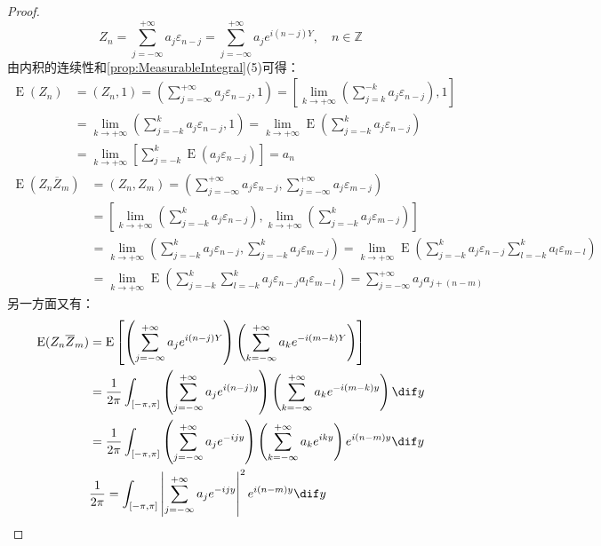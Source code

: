 \begin{proof}
	\begin{equation*}
		Z_n=\sum_{j=-\infty}^{+\infty}a_j\varepsilon_{n-j}=\sum_{j=-\infty}^{+\infty}a_je^{i(n-j)Y},\quad n\in\mathbb{Z}^{}
	\end{equation*}
	由内积的连续性和\cref{prop:MeasurableIntegral}(5)可得：
	\begin{align*}
		\operatorname{E}(Z_n)&=(Z_n,1)=\left(\sum_{j=-\infty}^{+\infty}a_j\varepsilon_{n-j},1\right)=\left[\lim_{k\to+\infty}\left(\sum_{j=k}^{-k}a_j\varepsilon_{n-j}\right),1\right] \\
		&=\lim_{k\to+\infty}\left(\sum_{j=-k}^{k}a_j\varepsilon_{n-j},1\right)=\lim_{k\to+\infty}\operatorname{E}\left(\sum_{j=-k}^{k}a_j\varepsilon_{n-j}\right) \\
		&=\lim_{k\to+\infty}\left[\sum_{j=-k}^{k}\operatorname{E}(a_j\varepsilon_{n-j})\right]=a_n
	\end{align*}
	\begin{align*}
		\operatorname{E}(Z_n\overline{Z}_m)&=(Z_n,Z_m)=\left(\sum_{j=-\infty}^{+\infty}a_j\varepsilon_{n-j},\sum_{j=-\infty}^{+\infty}a_j\varepsilon_{m-j}\right) \\
		&=\left[\lim_{k\to+\infty}\left(\sum_{j=-k}^{k}a_j\varepsilon_{n-j}\right),\lim_{k\to+\infty}\left(\sum_{j=-k}^{k}a_j\varepsilon_{m-j}\right)\right] \\
		&=\lim_{k\to+\infty}\left(\sum_{j=-k}^{k}a_j\varepsilon_{n-j},\sum_{j=-k}^{k}a_j\varepsilon_{m-j}\right)=\lim_{k\to+\infty}\operatorname{E}\left(\sum_{j=-k}^{k}a_j\varepsilon_{n-j}\sum_{l=-k}^{k}a_l\varepsilon_{m-l}\right) \\
		&=\lim_{k\to+\infty}\operatorname{E}\left(\sum_{j=-k}^{k}\sum_{l=-k}^{k}a_j\varepsilon_{n-j}a_l\varepsilon_{m-l}\right)=\sum_{j=-\infty}^{+\infty}a_ja_{j+(n-m)} 
	\end{align*}
	另一方面又有：
	\begin{align*}
		\operatorname{E}(Z_n\overline{Z}_m)&=\operatorname{E}\left[\left(\sum_{j=-\infty}^{+\infty}a_je^{i(n-j)Y}\right)\left(\sum_{k=-\infty}^{+\infty}a_ke^{-i(m-k)Y}\right)\right] \\
		&=\frac{1}{2\pi}\int_{[-\pi,\pi]}\left(\sum_{j=-\infty}^{+\infty}a_je^{i(n-j)y}\right)\left(\sum_{k=-\infty}^{+\infty}a_ke^{-i(m-k)y}\right)\dif y \\
		&=\frac{1}{2\pi}\int_{[-\pi,\pi]}\left(\sum_{j=-\infty}^{+\infty}a_je^{-ijy}\right)\left(\sum_{k=-\infty}^{+\infty}a_ke^{iky}\right)e^{i(n-m)y}\dif y \\
		&\frac{1}{2\pi}=\int_{[-\pi,\pi]}\left|\sum_{j=-\infty}^{+\infty}a_je^{-ijy}\right|^2e^{i(n-m)y}\dif y

\end{align*}
\end{proof}
